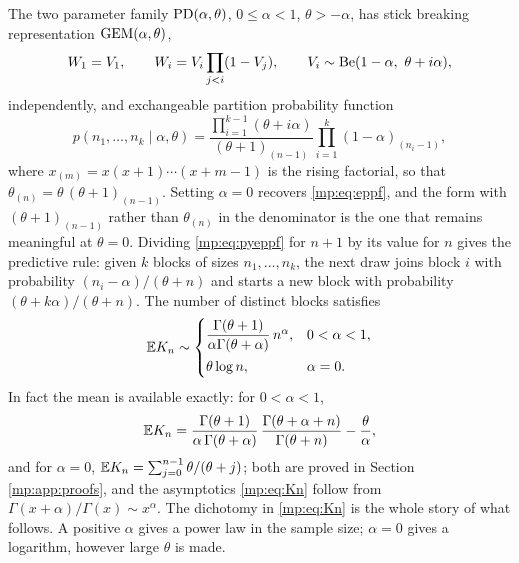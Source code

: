 The two parameter family $\mathrm{PD}(\alpha,\theta)$, $0\le\alpha<1$, $\theta>-\alpha$, has
stick breaking representation $\mathrm{GEM}(\alpha,\theta)$,
\begin{equation}
W_1=V_1,\qquad W_i=V_i\prod_{j<i}(1-V_j),\qquad V_i\sim\Be(1-\alpha,\ \theta+i\alpha),
\label{mp:eq:gem}
\end{equation}
independently, and exchangeable partition probability function
\begin{equation}
p(n_1,\dots,n_k\mid\alpha,\theta)
=\frac{\prod_{i=1}^{k-1}(\theta+i\alpha)}{(\theta+1)_{(n-1)}}\prod_{i=1}^{k}(1-\alpha)_{(n_i-1)} ,
\label{mp:eq:pyeppf}
\end{equation}
where $x_{(m)}=x(x+1)\cdots(x+m-1)$ is the rising factorial, so that
$\theta_{(n)}=\theta\,(\theta+1)_{(n-1)}$. Setting $\alpha=0$ recovers \eqref{mp:eq:eppf}, and
the form with $(\theta+1)_{(n-1)}$ rather than $\theta_{(n)}$ in the denominator is the one that
remains meaningful at $\theta=0$. Dividing \eqref{mp:eq:pyeppf} for $n+1$ by its value for $n$
gives the predictive rule: given $k$ blocks of sizes $n_1,\dots,n_k$, the next draw joins
block $i$ with probability $(n_i-\alpha)/(\theta+n)$ and starts a new block with probability
$(\theta+k\alpha)/(\theta+n)$. The number of distinct blocks satisfies
\begin{equation}
\mathbb{E} K_n \sim
\begin{cases}
\dfrac{\Gamma(\theta+1)}{\alpha\Gamma(\theta+\alpha)}\,n^\alpha, & 0<\alpha<1,\\[8pt]
\theta\log n, & \alpha=0 .
\end{cases}
\label{mp:eq:Kn}
\end{equation}
In fact the mean is available exactly: for $0<\alpha<1$,
\begin{equation}
\mathbb{E} K_n=\frac{\Gamma(\theta+1)}{\alpha\,\Gamma(\theta+\alpha)}\,
\frac{\Gamma(\theta+\alpha+n)}{\Gamma(\theta+n)}-\frac{\theta}{\alpha},
\label{mp:eq:EKexact}
\end{equation}
and for $\alpha=0$, $\mathbb{E} K_n=\sum_{j=0}^{n-1}\theta/(\theta+j)$; both are proved in Section
\ref{mp:app:proofs}, and the asymptotics \eqref{mp:eq:Kn} follow from
$\Gamma(x+\alpha)/\Gamma(x)\sim x^\alpha$.
The dichotomy in \eqref{mp:eq:Kn} is the whole story of what follows. A positive $\alpha$ gives
a power law in the sample size; $\alpha=0$ gives a logarithm, however large $\theta$ is
made.

